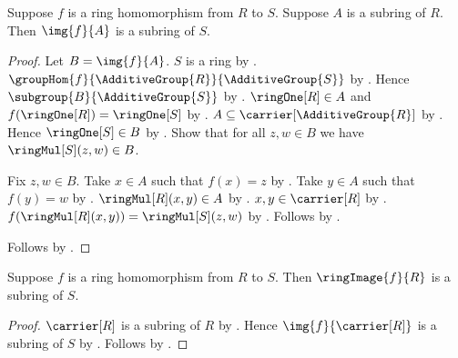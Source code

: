\begin{theorem}\label{ring_hom_subring_image}
    Suppose $f$ is a ring homomorphism from $R$ to $S$.
    Suppose $A$ is a subring of $R$.
    Then $\img{f}{A}$ is a subring of $S$.
\end{theorem}
\begin{proof}
    Let $B=\img{f}{A}$.
    $S$ is a ring by .
    $\groupHom{f}{\AdditiveGroup{R}}{\AdditiveGroup{S}}$ by
        .
    Hence $\subgroup{B}{\AdditiveGroup{S}}$ by
        .
    $\ringOne[R]\in A$ and
        $f(\ringOne[R])=\ringOne[S]$ by
        .
    $A\subseteq\carrier[\AdditiveGroup{R}]$ by
        .
    Hence $\ringOne[S]\in B$ by
        .
    Show that for all $z,w\in B$ we have $\ringMul[S](z,w)\in B$.
    \begin{subproof}
        Fix $z,w\in B$.
        Take $x\in A$ such that $f(x)=z$ by
            .
        Take $y\in A$ such that $f(y)=w$ by
            .
        $\ringMul[R](x,y)\in A$ by .
        $x,y\in\carrier[R]$ by
            .
        $f(\ringMul[R](x,y))=\ringMul[S](z,w)$ by
            .
        Follows by
            .
    \end{subproof}
    Follows by .
\end{proof}

\begin{theorem}\label{ring_image_is_subring}
    Suppose $f$ is a ring homomorphism from $R$ to $S$.
    Then $\ringImage{f}{R}$ is a subring of $S$.
\end{theorem}
\begin{proof}
    $\carrier[R]$ is a subring of $R$ by
        .
    Hence $\img{f}{\carrier[R]}$ is a subring of $S$ by
        .
    Follows by .
\end{proof}
